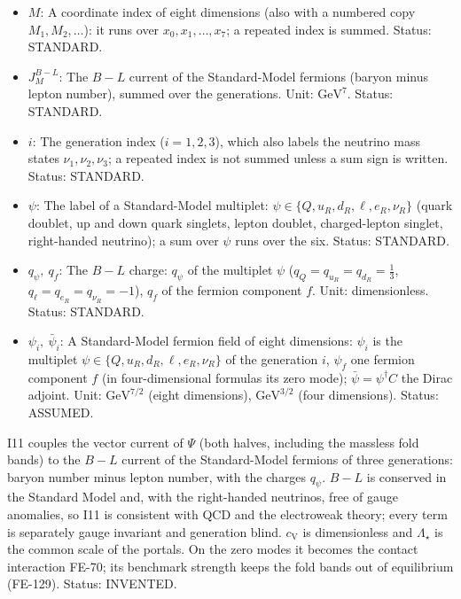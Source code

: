 \documentclass[
  10pt,
]{article}
\begin{document}
\begin{itemize}
  with a frame index are the author's real \(16 \times 16\) matrices of
  the Clifford algebra of signature \((4, 4)\);
  \(\gamma^M = \mathbf{e}_a{}^M\gamma^a\) along a coordinate
  (\(\gamma^{x_0}\), \(\gamma^{x_4}\), \ldots{} the matrices along
  \(x_0\), \(x_4\), \ldots), \(\gamma_M = g_{MN}\gamma^N\);
  \(\gamma^\mu\) the matrices of the four observable directions in
  four-dimensional formulas. Unit: dimensionless. Status: AUTHOR.
\item
  \(M\): A coordinate index of eight dimensions (also with a numbered
  copy \(M_1, M_2, \dots\)): it runs over \(x_0, x_1, \dots, x_7\); a
  repeated index is summed. Status: STANDARD.
\item
  \(J^{B-L}_M\): The \(B - L\) current of the Standard-Model fermions
  (baryon minus lepton number), summed over the generations. Unit:
  \(\mathrm{GeV}^{7}\). Status: STANDARD.
\item
  \(i\): The generation index (\(i = 1, 2, 3\)), which also labels the
  neutrino mass states \(\nu_1, \nu_2, \nu_3\); a repeated index is not
  summed unless a sum sign is written. Status: STANDARD.
\item
  \(\psi\): The label of a Standard-Model multiplet:
  \(\psi \in \{Q, u_R, d_R, \ell, e_R, \nu_R\}\) (quark doublet, up and
  down quark singlets, lepton doublet, charged-lepton singlet,
  right-handed neutrino); a sum over \(\psi\) runs over the six. Status:
  STANDARD.
\item
  \(q_\psi,\ q_f\): The \(B - L\) charge: \(q_\psi\) of the multiplet
  \(\psi\) (\(q_Q = q_{u_R} = q_{d_R} = \frac13\),
  \(q_\ell = q_{e_R} = q_{\nu_R} = -1\)), \(q_f\) of the fermion
  component \(f\). Unit: dimensionless. Status: STANDARD.
\item
  \(\psi_i,\ \bar\psi_i\): A Standard-Model fermion field of eight
  dimensions: \(\psi_i\) is the multiplet
  \(\psi \in \{Q, u_R, d_R, \ell, e_R, \nu_R\}\) of the generation
  \(i\), \(\psi_f\) one fermion component \(f\) (in four-dimensional
  formulas its zero mode); \(\bar\psi = \psi^\dagger C\) the Dirac
  adjoint. Unit: \(\mathrm{GeV}^{7/2}\) (eight dimensions),
  \(\mathrm{GeV}^{3/2}\) (four dimensions). Status: ASSUMED.
\end{itemize}

I11 couples the vector current of \(\Psi\) (both halves, including the
massless fold bands) to the \(B - L\) current of the Standard-Model
fermions of three generations: baryon number minus lepton number, with
the charges \(q_\psi\). \(B - L\) is conserved in the Standard Model
and, with the right-handed neutrinos, free of gauge anomalies, so I11 is
consistent with QCD and the electroweak theory; every term is separately
gauge invariant and generation blind. \(c_{\mathrm{V}}\) is
dimensionless and \(\Lambda_\star\) is the common scale of the portals.
On the zero modes it becomes the contact interaction FE-70; its
benchmark strength keeps the fold bands out of equilibrium (FE-129).
Status: INVENTED.
\end{document}
